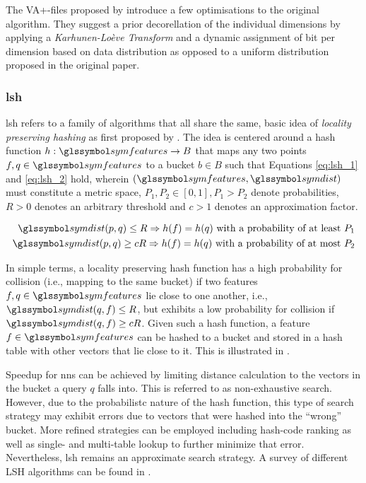 The VA+-files proposed by \cite{Ferhatosmanoglu:2000Vector} introduce a few optimisations to the original algorithm. They suggest a prior decorellation of the individual dimensions by applying a \emph{Karhunen-Loève Transform} and a dynamic assignment of bit per dimension based on data distribution as opposed to a uniform distribution proposed in the original paper.

\subsubsection{\acrfull{lsh}}

\acrshort{lsh} refers to a family of algorithms \cite{Echihabi:2021High,Wang:2017ASurvey} that all share the same, basic idea of \emph{locality preserving hashing} as first proposed by \cite{Indyk1998:Approximate}. The idea is centered around a hash function $h: \symfeatures \rightarrow B$ that maps any two points $f,q \in \symfeatures$ to a bucket $b \in B$ such that Equations \ref{eq:lsh_1} and \ref{eq:lsh_2} hold, wherein $(\symfeatures, \symdist)$ must constitute a metric space, $P_1, P_2 \in [0, 1], P_1 > P_2$ denote probabilities, $R > 0$ denotes an arbitrary threshold and $c > 1$ denotes an approximation factor.

\begin{eqnarray}
    \symdist (p,q) \leq R \Rightarrow h(f) = h(q) \text{ with a probability of at least } P_1 \label{eq:lsh_1} \\
    \symdist (p,q) \geq cR \Rightarrow h(f) = h(q) \text{ with a probability of at most } P_2 \label{eq:lsh_2}
\end{eqnarray}

In simple terms, a locality preserving hash function has a high probability for collision (i.e., mapping to the same bucket) if two features $f,q \in \symfeatures$ lie close to one another, i.e., $\symdist(q,f) \leq R$, but exhibits a low probability for collision if $\symdist(q,f) \geq cR$. Given such a hash function, a feature $f \in \symfeatures$ can be hashed to a bucket and stored in a hash table with other vectors that lie close to it. This is illustrated in . 

Speedup for \acrshort{nns} can be achieved by limiting distance calculation to the vectors in the bucket a query $q$ falls into. This is referred to as non-exhaustive search. However, due to the probabilistc nature of the hash function, this type of search strategy may exhibit errors due to vectors that were hashed into the ``wrong'' bucket. More refined strategies can be employed including hash-code ranking as well as single- and multi-table lookup \cite{Wang:2017ASurvey} to further minimize that error. Nevertheless, \acrshort{lsh} remains an approximate search strategy. A survey of different LSH algorithms can be found in \cite{Wang:2017ASurvey}.

